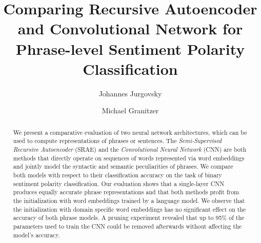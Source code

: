 \documentclass{llncs}
\begin{document}
\mainmatter              %
%
\title{Comparing Recursive Autoencoder and Convolutional Network for Phrase-level Sentiment Polarity Classification}
%
%
\author{Johannes Jurgovsky \and Michael Granitzer}
%
%
%

\maketitle              %

\begin{abstract}
We present a comparative evaluation of two neural network architectures, which can be used to compute representations of phrases or sentences. The \textit{Semi-Supervised Recursive Autoencoder} (SRAE) and the \textit{Convolutional Neural Network} (CNN) are both methods that directly operate on sequences of words represented via word embeddings and jointly model the syntactic and semantic peculiarities of phrases. We compare both models with respect to their classification accuracy on the task of binary sentiment polarity classification. Our evaluation shows that a single-layer CNN produces equally accurate phrase representations and that both methods profit from the initialization with word embeddings trained by a language model. We observe that the initialization with domain specific word embeddings has no significant effect on the accuracy of both phrase models. A pruning experiment revealed that up to 95\% of the parameters used to train the CNN could be removed afterwards without affecting the model's accuracy.

\end{abstract}
\end{document}
